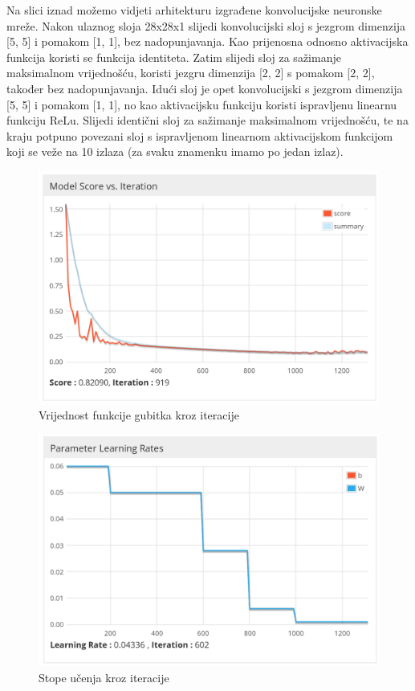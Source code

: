 \documentclass[times, utf8, diplomski]{fer}
\theoremstyle{definition}
\begin{document}
Na slici iznad možemo vidjeti arhitekturu izgrađene konvolucijske neuronske mreže. Nakon ulaznog sloja 28x28x1 slijedi konvolucijski sloj s jezgrom dimenzija [5, 5] i pomakom [1, 1], bez nadopunjavanja. Kao prijenosna odnosno aktivacijska funkcija koristi se funkcija identiteta. Zatim slijedi sloj za sažimanje maksimalnom vrijednošću, koristi jezgru dimenzija [2, 2] s pomakom [2, 2], također bez nadopunjavanja. Idući sloj je opet konvolucijski s jezgrom dimenzija [5, 5] i pomakom [1, 1], no kao aktivacijsku funkciju koristi ispravljenu linearnu funkciju ReLu. Slijedi identični sloj za sažimanje maksimalnom vrijednošću, te na kraju potpuno povezani sloj s ispravljenom linearnom aktivacijskom funkcijom koji se veže na 10 izlaza (za svaku znamenku imamo po jedan izlaz).

\begin{figure}[h]
\centering
\includegraphics[scale=0.3]{funkcija_gubitka.png}
\caption{Vrijednost funkcije gubitka kroz iteracije}
\end{figure}

\begin{figure}[h]
\centering
\includegraphics[scale=0.28]{learning_rate.png}
\caption{Stope učenja kroz iteracije}
\end{figure}
\end{document}
